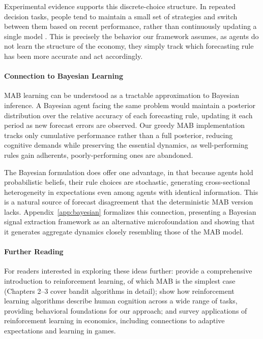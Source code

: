 \documentclass[10pt]{article}
\begin{document}
Experimental evidence supports this discrete-choice structure. In repeated decision tasks, people tend to maintain a small set of strategies and switch between them based on recent performance, rather than continuously updating a single model \citep[see][for a synthesis]{binz2023}. This is precisely the behavior our framework assumes, as agents do not learn the structure of the economy, they simply track which forecasting rule has been more accurate and act accordingly.

\paragraph{Connection to Bayesian Learning} MAB learning can be understood as a tractable approximation to Bayesian inference. A Bayesian agent facing the same problem would maintain a posterior distribution over the relative accuracy of each forecasting rule, updating it each period as new forecast errors are observed. Our greedy MAB implementation tracks only cumulative performance rather than a full posterior, reducing cognitive demands while preserving the essential dynamics, as well-performing rules gain adherents, poorly-performing ones are abandoned.

The Bayesian formulation does offer one advantage, in that because agents hold probabilistic beliefs, their rule choices are stochastic, generating cross-sectional heterogeneity in expectations even among agents with identical information. This is a natural source of forecast disagreement that the deterministic MAB version lacks. Appendix~\ref{app:bayesian} formalizes this connection, presenting a Bayesian signal extraction framework as an alternative microfoundation and showing that it generates aggregate dynamics closely resembling those of the MAB model.

\paragraph{Further Reading} For readers interested in exploring these ideas further: \citet{sutton2018reinforcement} provide a comprehensive introduction to reinforcement learning, of which MAB is the simplest case (Chapters 2--3 cover bandit algorithms in detail); \citet{binz2023} show how reinforcement learning algorithms describe human cognition across a wide range of tasks, providing behavioral foundations for our approach; and \citet{charpentier2021} survey applications of reinforcement learning in economics, including connections to adaptive expectations and learning in games.
\end{document}
